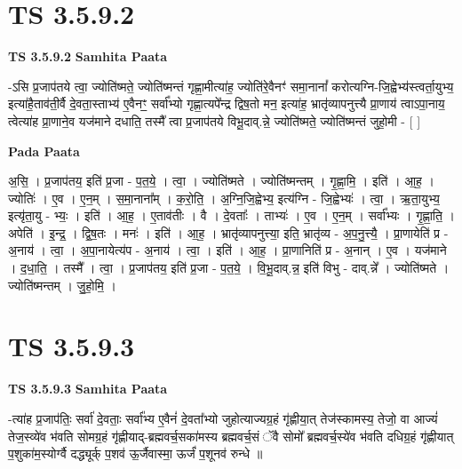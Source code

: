 \documentclass[17pt]{extarticle}
\begin{document}

\section{ TS 3.5.9.2 }

\textbf{TS 3.5.9.2 } \newline
\textbf{Samhita Paata} \newline

-ऽसि प्र॒जाप॑तये त्वा॒ ज्योति॑ष्मते॒ ज्योति॑ष्मन्तं गृह्णा॒मीत्या॑ह॒ ज्योति॑रे॒वैनꣳ॑ समा॒नानां᳚ करोत्यग्नि-जि॒ह्वेभ्य॑स्त्वर्ता॒युभ्य॒ इत्या॑है॒ताव॑ती॒र्वै दे॒वता॒स्ताभ्य॑ ए॒वैनꣳ॒॒ सर्वा᳚भ्यो गृह्णा॒त्यपे᳚न्द्र द्विष॒तो मन॒ इत्या॑ह॒ भ्रातृ॑व्यापनुत्त्यै प्रा॒णाय॑ त्वाऽपा॒नाय॒ त्वेत्या॑ह प्रा॒णाने॒व यज॑माने दधाति॒ तस्मै᳚ त्वा प्र॒जाप॑तये विभू॒दाव्.न्ने॒ ज्योति॑ष्मते॒ ज्योति॑ष्मन्तं जुहो॒मी - [  ] \newline

\textbf{Pada Paata} \newline

अ॒सि॒ । प्र॒जाप॑तय॒ इति॑ प्र॒जा - प॒त॒ये॒ । त्वा॒ । ज्योति॑ष्मते । ज्योति॑ष्मन्तम् । गृ॒ह्णा॒मि॒ । इति॑ । आ॒ह॒ । ज्योतिः॑ । ए॒व । ए॒न॒म् । स॒मा॒नाना᳚म् । क॒रो॒ति॒ । अ॒ग्नि॒जि॒ह्वेभ्य॒ इत्य॑ग्नि - जि॒ह्वेभ्यः॑ । त्वा॒ । ऋ॒ता॒युभ्य॒ इत्यृ॑ता॒यु - भ्यः॒ । इति॑ । आ॒ह॒ । ए॒ताव॑तीः । वै । दे॒वताः᳚ । ताभ्यः॑ । ए॒व । ए॒न॒म् । सर्वा᳚भ्यः । गृ॒ह्णा॒ति॒ । अपेति॑ । इ॒न्द्र॒ । द्वि॒ष॒तः । मनः॑ । इति॑ । आ॒ह॒ । भ्रातृ॑व्यापनुत्त्या॒ इति॒ भ्रातृ॑व्य - अ॒प॒नु॒त्त्यै॒ । प्रा॒णायेति॑ प्र - अ॒नाय॑ । त्वा॒ । अ॒पा॒नायेत्य॑प - अ॒नाय॑ । त्वा॒ । इति॑ । आ॒ह॒ । प्रा॒णानिति॑ प्र - अ॒नान् । ए॒व । यज॑माने । द॒धा॒ति॒ । तस्मै᳚ । त्वा॒ । प्र॒जाप॑तय॒ इति॑ प्र॒जा - प॒त॒ये॒ । वि॒भू॒दाव्.न्न॒ इति॑ विभु - दाव्.न्ने᳚ । ज्योति॑ष्मते । ज्योति॑ष्मन्तम् । जु॒हो॒मि॒ ।  \newline





\section{ TS 3.5.9.3 }

\textbf{TS 3.5.9.3 } \newline
\textbf{Samhita Paata} \newline

-त्या॑ह प्र॒जाप॑तिः॒ सर्वा॑ दे॒वताः॒ सर्वा᳚भ्य ए॒वैनं॑ दे॒वता᳚भ्यो जुहोत्याज्यग्र॒हं गृ॑ह्णीया॒त् तेज॑स्कामस्य॒ तेजो॒ वा आज्यं॑ तेज॒स्व्ये॑व भ॑वति सोमग्र॒हं गृ॑ह्णीयाद्-ब्रह्मवर्च॒सका॑मस्य ब्रह्मवर्च॒सं ॅवै सोमो᳚ ब्रह्मवर्च॒स्ये॑व भ॑वति दधिग्र॒हं गृ॑ह्णीयात् प॒शुका॑म॒स्योर्ग्वै दद्ध्यूर्क् प॒शव॑ ऊ॒र्जैवास्मा॒ ऊर्जं॑ प॒शूनव॑ रुन्धे ॥ \newline
\end{document}
